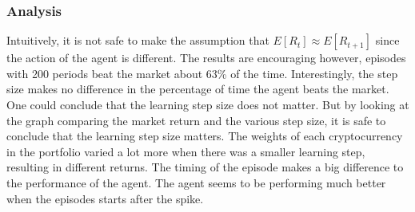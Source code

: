 \documentclass[a4paper,12pt]{article}
\begin{document}
\subsubsection{Analysis}
Intuitively, it is not safe to make the assumption that $E[R_t] \approx E[R_{t+1}]$ since the action of the agent is different. The results are encouraging however, episodes with 200 periods beat the market about 63\% of the time. Interestingly, the step size makes no difference in the percentage of time the agent beats the market. One could conclude that the learning step size  does not matter. But by looking at the graph comparing the market return and the various step size, it is safe to conclude that the learning step size matters. The weights of each cryptocurrency in the portfolio varied a lot more when there was a smaller learning step, resulting in different returns. The timing of the episode makes a big difference to the performance of the agent. The agent seems to be performing much better when the episodes starts after the spike. \par
\end{document}
